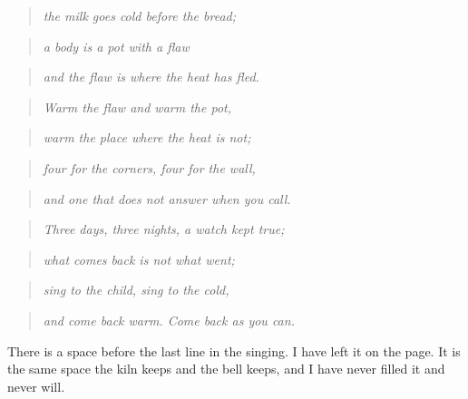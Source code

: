 \documentclass{design/chronicle}
\begin{document}
\begin{quote}\itshape the milk goes cold before the bread;\end{quote}

\begin{quote}\itshape a body is a pot with a flaw\end{quote}

\begin{quote}\itshape and the flaw is where the heat has fled.\end{quote}

\begin{quote}\itshape \end{quote}

\begin{quote}\itshape Warm the flaw and warm the pot,\end{quote}

\begin{quote}\itshape warm the place where the heat is not;\end{quote}

\begin{quote}\itshape four for the corners, four for the wall,\end{quote}

\begin{quote}\itshape and one that does not answer when you call.\end{quote}

\begin{quote}\itshape \end{quote}

\begin{quote}\itshape Three days, three nights, a watch kept true;\end{quote}

\begin{quote}\itshape what comes back is not what went;\end{quote}

\begin{quote}\itshape sing to the child, sing to the cold,\end{quote}

\begin{quote}\itshape and come back warm. Come back as you can.\end{quote}

There is a space before the last line in the singing. I have left it on the page. It is the same space the kiln keeps and the bell keeps, and I have never filled it and never will.
\end{document}
